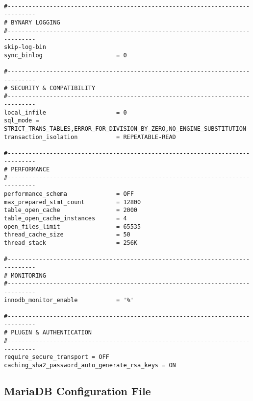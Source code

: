 \begin{lstlisting}[caption={MySQL configuration file}, label={lst:mysql-config}]
#------------------------------------------------------------------------------
# BYNARY LOGGING
#------------------------------------------------------------------------------
skip-log-bin
sync_binlog                     = 0

#------------------------------------------------------------------------------
# SECURITY & COMPATIBILITY
#------------------------------------------------------------------------------
local_infile                    = 0
sql_mode = STRICT_TRANS_TABLES,ERROR_FOR_DIVISION_BY_ZERO,NO_ENGINE_SUBSTITUTION
transaction_isolation           = REPEATABLE-READ

#------------------------------------------------------------------------------
# PERFORMANCE
#------------------------------------------------------------------------------
performance_schema              = OFF
max_prepared_stmt_count         = 12800
table_open_cache                = 2000
table_open_cache_instances      = 4
open_files_limit                = 65535
thread_cache_size               = 50
thread_stack                    = 256K

#------------------------------------------------------------------------------
# MONITORING
#------------------------------------------------------------------------------
innodb_monitor_enable           = '%'

#------------------------------------------------------------------------------
# PLUGIN & AUTHENTICATION
#------------------------------------------------------------------------------
require_secure_transport = OFF
caching_sha2_password_auto_generate_rsa_keys = ON
\end{lstlisting}

\subsection{MariaDB Configuration File}
\label{sec:mariadb-config}

